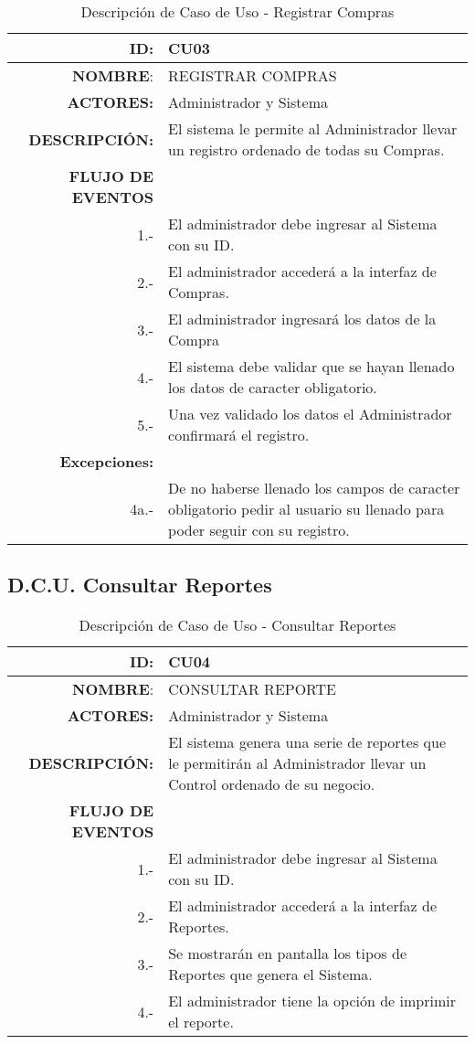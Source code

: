 \documentclass[a4paper,11pt, spanish]{report}
\begin{document}
{{{{{{{{{{{{{{{{{\renewcommand{\arraystretch}{1.25}%
  \begin{table}[H]
  \begin{tabularx}{\textwidth}{r|X}
  \textbf{ID}: & CU03\\\hline
  \textbf{NOMBRE}: & REGISTRAR COMPRAS\\\hline
  \textbf{ACTORES:} & Administrador y Sistema \\\hline
  \textbf{DESCRIPCIÓN:} & El sistema le permite al Administrador llevar un registro ordenado de todas su Compras.  \\\hline
  \textbf{FLUJO DE EVENTOS}  \\
  1.- & El administrador debe ingresar al Sistema con su ID.\\
  2.- & El administrador accederá a la interfaz de Compras.\\
  3.- & El administrador ingresará los datos de la Compra\\
  4.- & El sistema debe validar que se hayan llenado los datos de caracter obligatorio.\\
  5.- & Una vez validado los datos el Administrador confirmará el registro. \\\hline
  \textbf{Excepciones:} & \\
  4a.- & De no haberse llenado los campos de caracter obligatorio pedir al usuario su llenado para poder seguir con su registro.
  \end{tabularx}
  \caption{Descripción de Caso de Uso - Registrar Compras}
  \end{table}

\subsection{D.C.U. Consultar Reportes}

  {\renewcommand{\arraystretch}{1.25}%
  \begin{table}[H]
  \begin{tabularx}{\textwidth}{r|X}
  \textbf{ID}: & CU04\\\hline
  \textbf{NOMBRE}: & CONSULTAR REPORTE\\\hline
  \textbf{ACTORES:} & Administrador y Sistema \\\hline
  \textbf{DESCRIPCIÓN:} & El sistema genera una serie de reportes que le permitirán al Administrador llevar un Control ordenado de su negocio.  \\\hline
  \textbf{FLUJO DE EVENTOS}  \\
  1.- & El administrador debe ingresar al Sistema con su ID.\\
  2.- & El administrador accederá a la interfaz de Reportes.\\
  3.- & Se mostrarán en pantalla los tipos de Reportes que genera el Sistema.\\
  4.- & El administrador tiene la opción de imprimir el reporte.\\\hline
  \end{tabularx}
  \caption{Descripción de Caso de Uso - Consultar Reportes}
  \end{table}

}}}}}}}}}}}}}}}}}}
\end{document}
